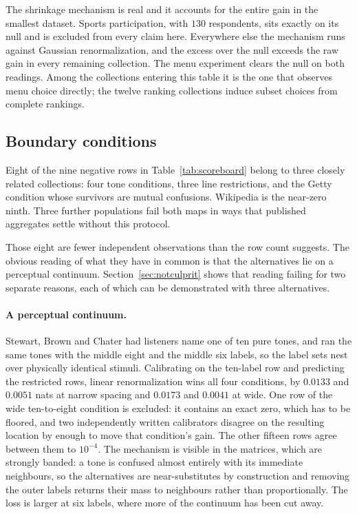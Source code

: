 \documentclass[11pt]{article}
\begin{document}
The shrinkage mechanism is real and it accounts for the entire gain in the smallest
dataset. Sports participation, with $130$ respondents, sits exactly on its null and is
excluded from every claim here. Everywhere else the mechanism runs against Gaussian renormalization, and
the excess over the null exceeds the raw gain in every remaining collection. The menu experiment clears the null on both readings. Among the collections entering this
table it is the one that observes menu choice directly; the twelve ranking collections induce
subset choices from complete rankings.

\subsection{Boundary conditions}
\label{sec:boundary}

Eight of the nine negative rows in Table~\ref{tab:scoreboard} belong to three closely related
collections: four tone conditions, three line restrictions, and the Getty condition whose
survivors are mutual confusions. Wikipedia is the near-zero ninth. Three further populations fail
both maps in ways that published aggregates settle without this protocol.

Those eight are fewer independent observations than the row count suggests. The obvious reading of
what they have in common is that the alternatives lie on a perceptual continuum.
Section~\ref{sec:notculprit} shows that reading failing for two separate reasons, each of which
can be demonstrated with three alternatives.

\paragraph{A perceptual continuum.} Stewart, Brown and Chater \cite{stewart2005} had
listeners name one of ten pure tones, and ran the same tones with the middle eight and the
middle six labels, so the label sets nest over physically identical stimuli. Calibrating on
the ten-label row and predicting the restricted rows, linear renormalization wins all four
conditions, by $0.0133$ and
$0.0051$ nats at narrow spacing and $0.0173$ and $0.0041$ at wide. One row of the wide
ten-to-eight condition is excluded: it contains an exact zero, which has to be floored, and two
independently written calibrators disagree on the resulting location by enough to move that
condition's gain. The other fifteen rows agree between them to $10^{-4}$. The mechanism is visible in the matrices, which are strongly banded: a tone is
confused almost entirely with its immediate neighbours, so the alternatives are
near-substitutes by construction and removing the outer labels returns their mass to
neighbours rather than proportionally. The loss is larger at six labels, where more of the
continuum has been cut away.
\end{document}
